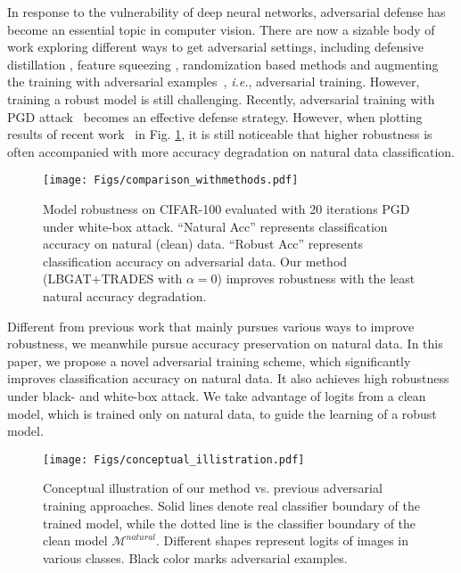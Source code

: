 \documentclass[10pt,twocolumn,letterpaper]{article}
\begin{document}
In response to the vulnerability of deep neural networks, adversarial defense has become an essential topic in computer vision. There are now a sizable body of work exploring different ways to get adversarial settings, including defensive distillation \cite{DBLP:conf/sp/PapernotM0JS16}, feature squeezing \cite{DBLP:conf/ndss/Xu0Q18}, randomization based methods \cite{DBLP:conf/iclr/XieWZRY18,DBLP:conf/iclr/DhillonALBKKA18} and augmenting the training with adversarial examples~\cite{zhang2019theoretically,DBLP:journals/corr/abs-1803-06373,DBLP:conf/iclr/MadryMSTV18,DBLP:conf/iclr/TramerKPGBM18}, {\it i.e.}, adversarial training. However, training a robust model is still challenging. Recently, adversarial training with PGD attack~\cite{DBLP:conf/iclr/MadryMSTV18} becomes an effective defense strategy. However, when plotting results of recent work~\cite{zhang2019theoretically,DBLP:journals/corr/abs-1803-06373,DBLP:conf/iclr/MadryMSTV18} in Fig. \ref{fig:comparison_methods}, it is still noticeable that higher robustness is often accompanied with more accuracy degradation on natural data classification. 

\begin{figure}
	\begin{center}
		\texttt{[image: Figs/comparison\_withmethods.pdf]}
		\caption{Model robustness on CIFAR-100 evaluated with 20 iterations PGD under white-box attack. ``Natural Acc'' represents classification accuracy on natural (clean) data. ``Robust Acc'' represents classification accuracy on adversarial data.
			Our method (LBGAT+TRADES with $\alpha=0$) improves robustness with the least natural accuracy degradation.}
		\label{fig:comparison_methods}
	\end{center}
	\vspace{-0.3in}
\end{figure}

Different from previous work that mainly pursues various ways to improve robustness, we meanwhile pursue accuracy preservation on natural data.
In this paper, we propose a novel adversarial training scheme, which significantly improves classification accuracy on natural data. It also achieves high robustness under black- and white-box attack. We take advantage of logits from a clean model, which is trained only on natural data, to guide the learning of a robust model. 

\begin{figure*}[t]
	\begin{center}
		\texttt{[image: Figs/conceptual\_illistration.pdf]}
		\caption{Conceptual illustration of our method vs. previous adversarial training approaches. Solid lines denote real classifier boundary of the trained model, while the dotted line is the classifier boundary of the clean model $\mathcal{M}^{natural}$. Different shapes represent logits of images in various classes. Black color marks adversarial examples.} 
		\label{fig:illustration}
	\end{center}
	\vspace{-0.2in}
\end{figure*}
\end{document}
